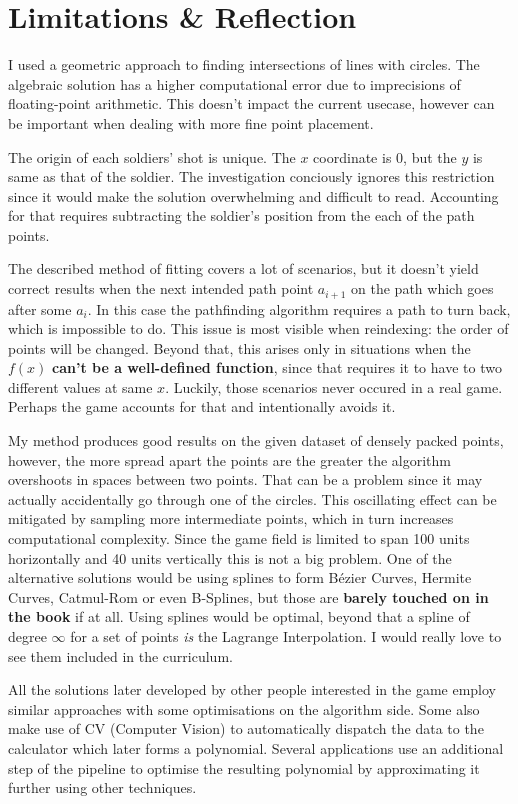 \documentclass[12pt, titlepage]{article}
\begin{document}
\section{Limitations \& Reflection}
I used a geometric approach to finding intersections of lines with circles.
The algebraic solution has a higher computational error due to imprecisions 
of floating-point arithmetic. This doesn't impact the current usecase,
however can be important when dealing with more fine point placement.

The origin of each soldiers' shot is unique. The $x$ 
coordinate is $0$, but the $y$ is same as that of the soldier. The investigation
conciously ignores this restriction since it would make the solution overwhelming
and difficult to read. Accounting for that requires subtracting the soldier's 
position from the each of the path points.

The described method of fitting covers a lot of scenarios, but it doesn't yield 
correct results
when the next intended path point $a_{i + 1}$ on the path which goes after 
some $a_i$. In this case the pathfinding algorithm requires a path to turn back,
which is impossible to do. This issue is most visible when reindexing: the order
of points will be changed. Beyond that, this arises only in situations when the 
$f(x)$ \textbf{can't be a well-defined function}, since that requires it to have to
two different values at same $x$. Luckily, those scenarios never occured in a 
real game. Perhaps the game accounts for that and intentionally avoids it.

My method produces good results on the given dataset of densely packed points,
however, the more spread apart the points are the greater the algorithm
overshoots in spaces between two points. That can be a problem since it may 
actually accidentally go through one of the circles. This oscillating effect can be
mitigated by sampling more intermediate points, which in turn increases 
computational complexity. Since the game field is  limited to span 100 units
horizontally and 40 units vertically this is not a big problem. One of the
alternative solutions would be using splines to form B\'{e}zier Curves, 
Hermite Curves, Catmul-Rom or even B-Splines, but those are \textbf{barely touched 
on in the book} if at all. Using splines would be optimal, beyond that
a spline of degree $\infty$ for a set of points \textit{is} the Lagrange
Interpolation. I would really love to see them included in the 
curriculum.

All the solutions later developed by other people interested in the game employ
similar approaches with some optimisations on the algorithm side. Some also
make use of CV (Computer Vision) to automatically dispatch the data to the
calculator which later forms a polynomial. Several applications use
an additional step of the pipeline to optimise the resulting polynomial
by approximating it further using other techniques.
\end{document}
